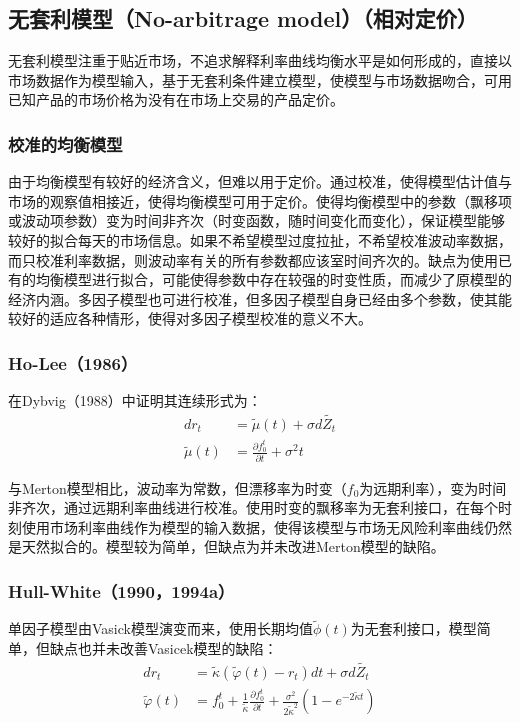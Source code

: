 \documentclass[11pt]{article}
\begin{document}
\subsection{无套利模型（No-arbitrage model）（相对定价）}

无套利模型注重于贴近市场，不追求解释利率曲线均衡水平是如何形成的，直接以市场数据作为模型输入，基于无套利条件建立模型，使模型与市场数据吻合，可用已知产品的市场价格为没有在市场上交易的产品定价。

\subsubsection{校准的均衡模型}

由于均衡模型有较好的经济含义，但难以用于定价。通过校准，使得模型估计值与市场的观察值相接近，使得均衡模型可用于定价。使得均衡模型中的参数（飘移项或波动项参数）变为时间非齐次（时变函数，随时间变化而变化），保证模型能够较好的拟合每天的市场信息。如果不希望模型过度拉扯，不希望校准波动率数据，而只校准利率数据，则波动率有关的所有参数都应该室时间齐次的。缺点为使用已有的均衡模型进行拟合，可能使得参数中存在较强的时变性质，而减少了原模型的经济内涵。多因子模型也可进行校准，但多因子模型自身已经由多个参数，使其能较好的适应各种情形，使得对多因子模型校准的意义不大。

\subsubsection{Ho-Lee（1986）}

在Dybvig（1988）中证明其连续形式为：
\begin{align*}
	dr_t &= \tilde{\mu}(t) + \sigma d\tilde{Z_t} \\
	\tilde{\mu}(t) &= \frac{\partial f^t_0}{\partial t} + \sigma^2 t
\end{align*}

与Merton模型相比，波动率为常数，但漂移率为时变（$f_0$为远期利率），变为时间非齐次，通过远期利率曲线进行校准。使用时变的飘移率为无套利接口，在每个时刻使用市场利率曲线作为模型的输入数据，使得该模型与市场无风险利率曲线仍然是天然拟合的。模型较为简单，但缺点为并未改进Merton模型的缺陷。

\subsubsection{Hull-White（1990，1994a）}

单因子模型由Vasick模型演变而来，使用长期均值$\tilde{\phi}(t)$为无套利接口，模型简单，但缺点也并未改善Vasicek模型的缺陷：
\begin{align*}
	dr_t &= \tilde{\kappa}(\tilde{\varphi}(t)-r_t)dt+\sigma d\tilde{Z_t} \\
	\tilde{\varphi}(t) &= f^t_0 + \frac{1}{\tilde{\kappa}}\frac{\partial f^t_0}{\partial t} + \frac{\sigma^2}{2\tilde{\kappa}^2} (1-e^{-2\tilde{\kappa}t})
\end{align*}
\end{document}
